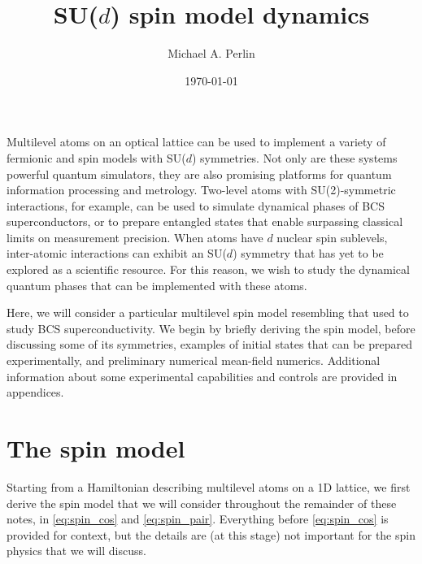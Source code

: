 \documentclass[nofootinbib,notitlepage,11pt]{revtex4-2}
\newcommand{\1}{\mathds{1}}
\begin{document}
\thispagestyle{fancy}

\title{SU($d$) spin model dynamics}%
\author{Michael A. Perlin}%
\date{\today}


\maketitle
\begin{singlespace}
  \tableofcontents
\end{singlespace}
\vspace{1cm}

Multilevel atoms on an optical lattice can be used to implement a variety of fermionic and spin models with SU($d$) symmetries.
Not only are these systems powerful quantum simulators, they are also promising platforms for quantum information processing and metrology.
Two-level atoms with SU(2)-symmetric interactions, for example, can be used to simulate dynamical phases of BCS superconductors, or to prepare entangled states that enable surpassing classical limits on measurement precision.
When atoms have $d$ nuclear spin sublevels, inter-atomic interactions can exhibit an SU($d$) symmetry that has yet to be explored as a scientific resource.
For this reason, we wish to study the dynamical quantum phases that can be implemented with these atoms.

Here, we will consider a particular multilevel spin model resembling that used to study BCS superconductivity.
We begin by briefly deriving the spin model, before discussing some of its symmetries, examples of initial states that can be prepared experimentally, and preliminary numerical mean-field numerics.
Additional information about some experimental capabilities and controls are provided in appendices.

\section{The spin model}

Starting from a Hamiltonian describing multilevel atoms on a 1D lattice, we first derive the spin model that we will consider throughout the remainder of these notes, in \eqref{eq:spin_cos} and \eqref{eq:spin_pair}.
Everything before \eqref{eq:spin_cos} is provided for context, but the details are (at this stage) not important for the spin physics that we will discuss.
\end{document}
